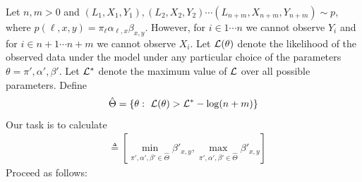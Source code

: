 \documentclass{article}
\theoremstyle{definition}
\begin{document}
Let $n,m>0$ and $(L_1,X_1,Y_1),(L_2,X_2,Y_2) \cdots (L_{n+m},X_{n+m},Y_{n+m}) \sim p$, where $p(\ell,x,y)=\pi_\ell \alpha_{\ell,x} \beta_{x,y}$.  However, for $i\in 1\cdots n$ we cannot observe $Y_i$ and for $i\in n+1 \cdots n+m$ we cannot observe $X_i$.  Let $\mathcal{L}(\theta)$ denote the likelihood of the observed data under the model under any particular choice of the parameters $\theta = \pi',\alpha',\beta'$.  Let $\mathcal{L}^*$ denote the maximum value of $\mathcal{L}$ over all possible parameters.  Define
\[
\hat \Theta=\left\{\theta:\ \LL(\theta) > \LL^* - \log(n + m)\right\}
\]
Our task is to calculate
\begin{align*}
[\hat \beta^-_{x,y},\hat \beta^+_{x,y}] &\triangleq \left[\min_{\pi',\alpha',\beta' \in \hat \Theta} \beta'_{x,y},\max_{\pi',\alpha',\beta' \in \hat \Theta}\beta'_{x,y}\right]
\end{align*}
Proceed as follows:
\end{document}
